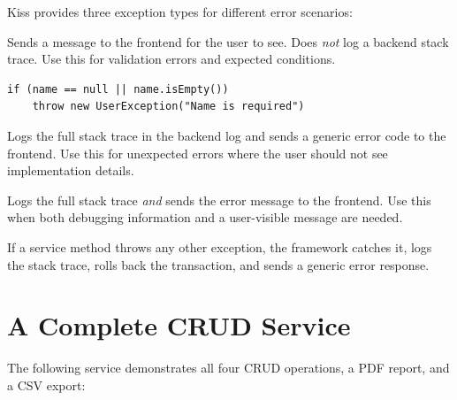 Kiss provides three exception types for different error scenarios:

\begin{description}[style=nextline]
  \item[\texttt{UserException}] Sends a message to the frontend for the user to see.  Does \emph{not} log a backend stack trace.  Use this for validation errors and expected conditions.

\begin{lstlisting}[style=groovy]
if (name == null || name.isEmpty())
    throw new UserException("Name is required")
\end{lstlisting}

  \item[\texttt{ServerException}] Logs the full stack trace in the backend log and sends a generic error code to the frontend.  Use this for unexpected errors where the user should not see implementation details.

  \item[\texttt{LogException}] Logs the full stack trace \emph{and} sends the error message to the frontend.  Use this when both debugging information and a user-visible message are needed.
\end{description}

\noindent
If a service method throws any other exception, the framework catches it, logs the stack trace, rolls back the transaction, and sends a generic error response.

\section{A Complete CRUD Service}
\label{sec:svc-crud-example}

The following service demonstrates all four CRUD operations, a PDF report, and a CSV export:

